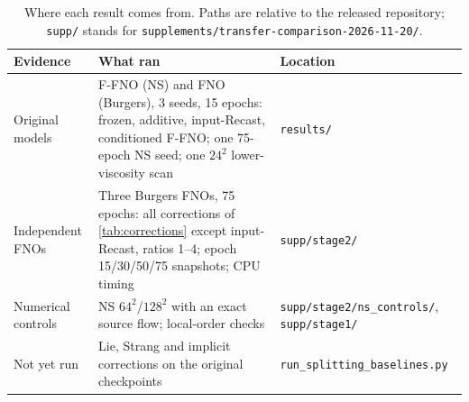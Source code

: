 \documentclass{article}
\theoremstyle{plain}
\begin{document}
\begin{table}[H]
\caption{Where each result comes from. Paths are relative to the released repository; \texttt{supp/} stands for \texttt{supplements/transfer-comparison-2026-11-20/}.}
\label{tab:inventory}
\centering
\small
\begin{tabular}{@{}p{} p{} p{}@{}}
\toprule
Evidence & What ran & Location \\
\midrule
Original models & F-FNO (NS) and FNO (Burgers), 3 seeds, 15 epochs: frozen, additive, input-Recast, conditioned F-FNO; one 75-epoch NS seed; one $24^2$ lower-viscosity scan & \texttt{results/} \\
Independent FNOs & Three Burgers FNOs, 75 epochs: all corrections of \cref{tab:corrections} except input-Recast, ratios 1--4; epoch 15/30/50/75 snapshots; CPU timing & \texttt{supp/stage2/} \\
Numerical controls & NS $64^2$/$128^2$ with an exact source flow; local-order checks & \texttt{supp/stage2/ns\_controls/}, \texttt{supp/stage1/} \\
Not yet run & Lie, Strang and implicit corrections on the original checkpoints & \texttt{run\_splitting\_baselines.py} \\
\bottomrule
\end{tabular}
\end{table}
\end{document}
